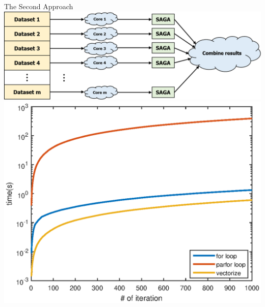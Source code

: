 \begin{frame}{The Second Approach}
	\centering
	\includegraphics[scale=0.35]{Picture2.png}
	\visible<2->
	{
		\medskip
		\medskip
		\centering
		\includegraphics[scale=0.5]{distributed2.eps} 
	}
\end{frame}

